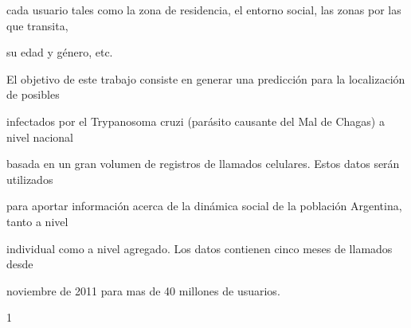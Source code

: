 cada usuario tales como la zona de residencia, el entorno social, las zonas por las que transita,

su edad y género, etc.

El objetivo de este trabajo consiste en generar una predicción para la localización de posibles

infectados por el Trypanosoma cruzi (parásito causante del Mal de Chagas) a nivel nacional

basada en un gran volumen de registros de llamados celulares. Estos datos serán utilizados

para aportar información acerca de la dinámica social de la población Argentina, tanto a nivel

individual como a nivel agregado. Los datos contienen cinco meses de llamados desde

noviembre de 2011 para mas de 40 millones de usuarios.

1